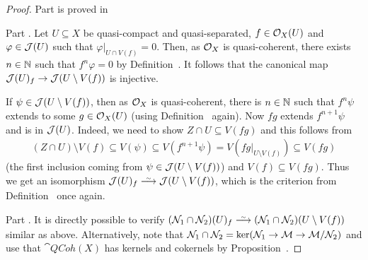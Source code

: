 \documentclass[a4paper,parskip=half,numbers=enddot, DIV=12]{scrreprt}
\begin{document}
\begin{proof}
	Part  is proved in \cite[Proposition~2.1.1]{alggeo1}

	Part . Let $U\subseteq X$ be quasi-compact and quasi-separated, $f\in\mathcal{O}_X(U)$ and $\varphi \in \mathcal{J}(U)$ such
	that $\varphi\vert_{U\cap V(f)}=0$. Then, as $\mathcal{O}_X$ is quasi-coherent, there exists $n\in\mathbb{N}$ such that $f^n\varphi = 0$ by Definition~.
	It follows that the canonical map $\mathcal{J}(U)_f\rightarrow \mathcal{J}(U\setminus V(f))$ is injective.

	If $\psi \in \mathcal{J}(U\setminus V(f))$, then as $\mathcal{O}_X$ is quasi-coherent, there is $n\in\mathbb{N}$ such that $f^n\psi$ extends to some
	$g\in \mathcal{O}_X(U)$ (using Definition~ again). Now $fg$ extends $f^{n+1}\psi$ and is in $\mathcal{J}(U)$. Indeed, we need to show $Z\cap U \subseteq V(fg)$ and this follows from
	\begin{align*}
		(Z\cap U)\setminus V(f)\subseteq V(\psi)\subseteq V\left(f^{n+1} \psi\right)=V\left(fg\vert_{U\setminus V(f)}\right)\subseteq V(fg)
	\end{align*}
	(the first inclusion coming from $\psi\in \mathcal{J}(U\setminus V(f))$) and $V(f)\subseteq V(fg)$. Thus we get an isomorphism $\Jj(U)_f\isomorphism \Jj(U\setminus V(f))$, which is the criterion from Definition~ once again.

	Part . It is directly possible to verify $(\Nn_1\cap \Nn_2)(U)_f\isomorphism (\Nn_1\cap \Nn_2)(U\setminus V(f))$ similar
	as above. Alternatively, note that $\mathcal{N}_1\cap \mathcal{N}_2 = \ker(\mathcal{N}_1\rightarrow \mathcal{M}\rightarrow\mathcal{M}/\mathcal{N}_2)$ and use that $\cat{QCoh}(X)$ has kernels and cokernels by Proposition~.
\end{proof}
\end{document}
